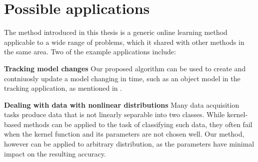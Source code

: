 \section{Possible applications}

The method introduced in this thesis is a generic online learning method applicable to a wide range of problems, which it shared with other methods in the same area.  Two of the example applications include:

{\bf Tracking model changes}
Our proposed algorithm can be used to create and contniuosly update a model changing in time, such as an object model in the tracking application, as mentioned in \cite{grabner2006}.

{\bf Dealing with data with nonlinear distributions}
Many data acquisition tasks produce data that is not linearly separable into two classes. While kernel-based methods can be applied to the task of classifying such data, they often fail when the kernel  function and its parameters are not chosen well. Our method, however can be applied to arbitrary distribution, as the parameters have minimal impact on the resulting accuracy. 

















